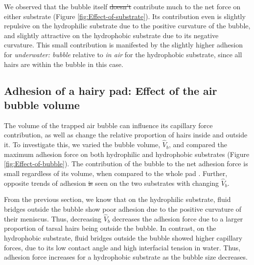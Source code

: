 \documentclass[vruler,JEB]{COB}%
\providecommand{\DIFadd}[1]{{\protect\color{blue}\uwave{#1}}} %
\providecommand{\DIFdel}[1]{{\protect\color{red}\sout{#1}}}                      %
\providecommand{\DIFaddbegin}{} %
\providecommand{\DIFaddend}{} %
\providecommand{\DIFdelbegin}{} %
\providecommand{\DIFdelend}{} %
\begin{document}
We observed that the bubble itself \DIFdelbegin \DIFdel{doesn't }\DIFdelend \DIFaddbegin \DIFadd{does not }\DIFaddend contribute much to the net force
on either substrate (Figure \ref{fig:Effect-of-substrate}). Its contribution
even is slightly repulsive on the hydrophilic substrate due to the
positive curvature of the bubble, and slightly attractive on the hydrophobic
substrate due to its negative curvature. This small contribution is
manifested by the slightly higher adhesion for \emph{underwater: bubble}
relative to \emph{in air} for the hydrophobic substrate, since all
hairs are within the bubble in this case.

\subsection{Adhesion of a hairy pad: Effect of the air bubble volume}

The volume of the trapped air bubble can influence its capillary force contribution,
as well as change the relative proportion of hairs inside and outside
it. To investigate this, we varied the bubble volume, \DIFdelbegin \DIFdel{$\hat{V}_{b}$}\DIFdelend \DIFaddbegin \DIFadd{$V_{b}$}\DIFaddend ,
and compared the maximum adhesion force on both hydrophilic and hydrophobic
substrates (Figure \ref{fig:Effect-of-bubble}). The contribution
of the bubble to the net adhesion force is small regardless of its
volume, when compared to the whole pad \DIFaddbegin \DIFadd{(less than 3 \%)}\DIFaddend . Further, opposite trends of
adhesion \DIFdelbegin \DIFdel{is }\DIFdelend \DIFaddbegin \DIFadd{are }\DIFaddend seen on the two substrates with changing \DIFdelbegin \DIFdel{$\hat{V}_{b}$}\DIFdelend \DIFaddbegin \DIFadd{$V_{b}$}\DIFaddend .

From the previous section, we know that on the hydrophilic substrate,
fluid bridges outside the bubble show poor adhesion due to the positive
curvature of their meniscus. Thus, decreasing \DIFdelbegin \DIFdel{$\hat{V}_{b}$ }\DIFdelend \DIFaddbegin \DIFadd{$V_{b}$ }\DIFaddend decreases
the adhesion force due to a larger proportion of tarsal hairs being outside
the bubble. In contrast, on the hydrophobic substrate, fluid bridges
outside the bubble showed higher capillary forces, due to its low contact
angle and high interfacial tension in water. Thus, adhesion force
increases for a hydrophobic substrate as the bubble size decreases. 
\end{document}
